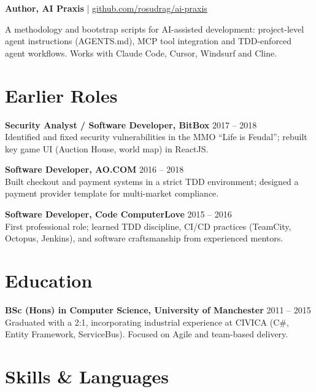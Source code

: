 \documentclass[11pt,a4paper]{article}
\begin{document}
\medskip

\textbf{Author, AI Praxis} | \href{https://github.com/rosudrag/ai-praxis}{github.com/rosudrag/ai-praxis}

\smallskip
A methodology and bootstrap scripts for AI-assisted development: project-level agent instructions (AGENTS.md), MCP tool integration and TDD-enforced agent workflows. Works with Claude Code, Cursor, Windsurf and Cline.

\bigskip

\section{Earlier Roles}

\textbf{Security Analyst / Software Developer, BitBox} \hfill 2017 -- 2018\\
Identified and fixed security vulnerabilities in the MMO ``Life is Feudal''; rebuilt key game UI (Auction House, world map) in ReactJS.

\medskip

\textbf{Software Developer, AO.COM} \hfill 2016 -- 2018\\
Built checkout and payment systems in a strict TDD environment; designed a payment provider template for multi-market compliance.

\medskip

\textbf{Software Developer, Code ComputerLove} \hfill 2015 -- 2016\\
First professional role; learned TDD discipline, CI/CD practices (TeamCity, Octopus, Jenkins), and software craftsmanship from experienced mentors.

\bigskip

\section{Education}

\textbf{BSc (Hons) in Computer Science, University of Manchester} \hfill 2011 -- 2015\\
Graduated with a 2:1, incorporating industrial experience at CIVICA (C\#, Entity Framework, ServiceBus). Focused on Agile and team-based delivery.

\bigskip

\section{Skills \& Languages}
\end{document}
